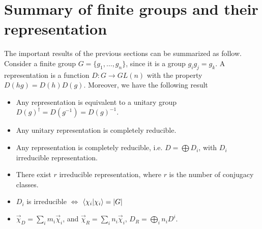 \documentclass[12pt]{book}
\theoremstyle{plain}
\theoremstyle{definition}
\theoremstyle{remark}
\begin{document}
\section{Summary of finite groups and their representation}
The important results of the previous sections can be summarized as follow.\\
Consider a finite group $G =\{g_1,\dots,g_n\}$, since it is a group $g_ig_j = g_k$. A representation is a function $D:G\to GL(n)$ with the property $D(hg) = D(h)D(g)$. Moreover, we have the following result
\begin{itemize}
\item Any representation is equivalent to a unitary group $D(g)^\dagger = D(g^{-1}) = D(g)^{-1}$.
\item Any unitary representation is completely reducible.
\item Any representation is completely reducible, i.e. $D = \bigoplus D_i$, with $D_i$ irreducible representation. 
\item There exist $r$ irreducible representation, where $r$ is the number of conjugacy classes.
\item $D_i$ is irreducible $\iff$ $\braket{\chi_i|\chi_i} = |G|$
\item $\overrightarrow{\chi}_D  =\sum_i m_i \overrightarrow{\chi}_i$, and $\overrightarrow{\chi}_R  =\sum_i n_i \overrightarrow{\chi}_i$, $D_R = \bigoplus_i n_i D^i$.
\end{itemize}
\end{document}
